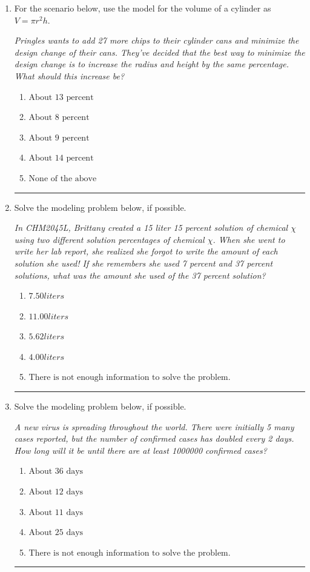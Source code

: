 \documentclass[14pt]{extbook}
\newcommand{\litem}[1]{\item#1\hspace*{-1cm}\rule{\textwidth}{0.4pt}}
\begin{document}
\begin{enumerate}
{\begin{enumerate}[label=\Alph*.]
\end{enumerate} }
\litem{
For the scenario below, use the model for the volume of a cylinder as $V = \pi r^2 h$.
\begin{center}
    \textit{ Pringles wants to add 27 \text{percent} more chips to their cylinder cans and minimize the design change of their cans. They've decided that the best way to minimize the design change is to increase the radius and height by the same percentage. What should this increase be? }
\end{center}
\begin{enumerate}[label=\Alph*.]
\item \( \text{About } 13 \text{ percent} \)
\item \( \text{About } 8 \text{ percent} \)
\item \( \text{About } 9 \text{ percent} \)
\item \( \text{About } 14 \text{ percent} \)
\item \( \text{None of the above} \)

\end{enumerate} }
\litem{
Solve the modeling problem below, if possible.
\begin{center}
    \textit{ In CHM2045L, Brittany created a 15 liter 15 percent solution of chemical $\chi$ using two different solution percentages of chemical $\chi$. When she went to write her lab report, she realized she forgot to write the amount of each solution she used! If she remembers she used 7 percent and 37 percent solutions, what was the amount she used of the 37 percent solution? }
\end{center}
\begin{enumerate}[label=\Alph*.]
\item \( 7.50 liters \)
\item \( 11.00 liters \)
\item \( 5.62 liters \)
\item \( 4.00 liters \)
\item \( \text{There is not enough information to solve the problem.} \)

\end{enumerate} }
\litem{
Solve the modeling problem below, if possible.
\begin{center}
    \textit{ A new virus is spreading throughout the world. There were initially 5 many cases reported, but the number of confirmed cases has doubled every 2 days. How long will it be until there are at least 1000000 confirmed cases? }
\end{center}
\begin{enumerate}[label=\Alph*.]
\item \( \text{About } 36 \text{ days} \)
\item \( \text{About } 12 \text{ days} \)
\item \( \text{About } 11 \text{ days} \)
\item \( \text{About } 25 \text{ days} \)
\item \( \text{There is not enough information to solve the problem.} \)


\end{enumerate}}
\end{enumerate}
\end{document}
